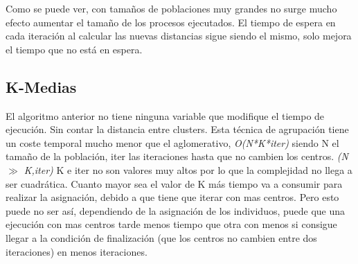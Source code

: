 			
			Como se puede ver, con tamaños de poblaciones muy grandes no surge mucho efecto aumentar el tamaño de los procesos ejecutados. El tiempo de espera en cada iteración al calcular las nuevas distancias sigue siendo el mismo, solo mejora el tiempo que no está en espera.
	
	
	
			\newpage

	\subsection{K-Medias}	

		El algoritmo anterior no tiene ninguna variable que modifique el tiempo de ejecución. Sin contar la distancia entre clusters. Esta técnica de agrupación tiene un coste temporal mucho menor que el aglomerativo, \textit{O(N*K*iter)} siendo N el tamaño de la población, iter las iteraciones  hasta que no cambien los centros. \textit{(N $\gg$ K,iter)} K e iter no son valores muy altos por lo que la complejidad no llega a ser cuadrática. Cuanto mayor sea el valor de K más tiempo va a consumir para realizar la asignación, debido a que tiene que iterar con mas centros. Pero esto puede no ser así, dependiendo de la asignación de los individuos, puede que una ejecución con mas centros tarde menos tiempo que otra con menos si consigue llegar a la condición de finalización (que los centros no cambien entre dos iteraciones) en menos iteraciones.
		
